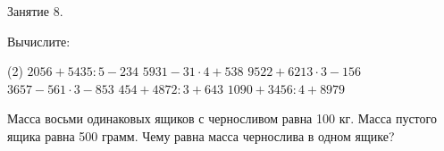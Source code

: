 \begin{class}[number=8]
	\begin{listofex}
		\item Занятие 8.
	\end{listofex}
\end{class}

\begin{homework}[number=4]
	\begin{listofex}
		\item Вычислите:
		\begin{tasks}(2)
			\task \( 2056 + 5435 : 5 - 234 \)
			\task \( 5931 - 31\cdot 4 + 538 \)
			\task \( 9522 + 6213\cdot 3 - 156 \)
			\task \( 3657 - 561 \cdot 3 - 853 \)
			\task \( 454 + 4872 : 3 + 643 \)
			\task \( 1090 + 3456: 4 + 8979 \)
		\end{tasks}
		\item Масса восьми одинаковых ящиков с черносливом равна 100 кг. Масса пустого ящика равна 500 грамм. Чему равна масса чернослива в одном ящике?
	\end{listofex}
\end{homework}
